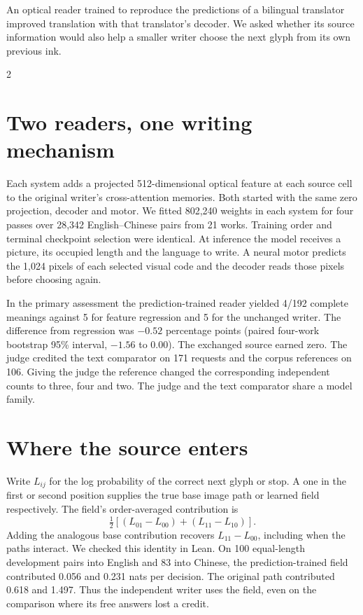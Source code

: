 \newpage
{}
\noindent An optical reader trained to reproduce the predictions of a bilingual translator improved translation with that translator's decoder. We asked whether its source information would also help a smaller writer choose the next glyph from its own previous ink.
\begin{multicols}{2}
\section*{Two readers, one writing mechanism}
Each system adds a projected 512-dimensional optical feature at each source cell to the original writer's cross-attention memories. Both started with the same zero projection, decoder and motor. We fitted 802,240 weights in each system for four passes over 28,342 English--Chinese pairs from 21 works. Training order and terminal checkpoint selection were identical. At inference the model receives a picture, its occupied length and the language to write. A neural motor predicts the 1,024 pixels of each selected visual code and the decoder reads those pixels before choosing again.
\par In the primary assessment the prediction-trained reader yielded 4/192 complete meanings against 5 for feature regression and 5 for the unchanged writer. The difference from regression was $-0.52$ percentage points (paired four-work bootstrap 95\% interval, $-1.56$ to $0.00$). The exchanged source earned zero. The judge credited the text comparator on 171 requests and the corpus references on 106. Giving the judge the reference changed the corresponding independent counts to three, four and two. The judge and the text comparator share a model family.
\section*{Where the source enters}
Write $L_{ij}$ for the log probability of the correct next glyph or stop. A one in the first or second position supplies the true base image path or learned field respectively. The field's order-averaged contribution is
\[
  \tfrac12[(L_{01}-L_{00})+(L_{11}-L_{10})].
\]
Adding the analogous base contribution recovers $L_{11}-L_{00}$, including when the paths interact. We checked this identity in Lean. On 100 equal-length development pairs into English and 83 into Chinese, the prediction-trained field contributed 0.056 and 0.231 nats per decision. The original path contributed 0.618 and 1.497. Thus the independent writer uses the field, even on the comparison where its free answers lost a credit.
\end{multicols}
